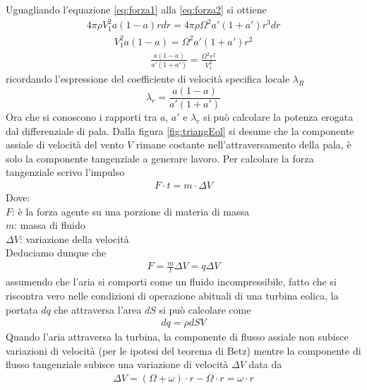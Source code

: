 Uguagliando l'equazione \ref{eq:forza1} alla \ref{eq:forza2} si ottiene
\begin{align*}
4 \pi \rho V_1^2 a \left( 1 - a \right) r dr = 4 \pi \rho \Omega^2 a' \left( 1 + a' \right) r^3 dr
\end{align*}
\begin{align*}
V_1^2 a \left( 1 - a \right) = \Omega^2 a' \left( 1 + a' \right) r^2
\end{align*}
\begin{align*}
\frac{a \left( 1 - a \right)}{a' \left(1 + a' \right)} = \frac{\Omega^2 r^2}{V_1^2}
\end{align*}
ricordando l'espressione del coefficiente di velocità specifica locale $\lambda_R$
\begin{equation}\label{eq:lambdara}
\lambda_r = \frac{a \left(1 - a \right)}{a' \left( 1 + a' \right)}
\end{equation}
Ora che si conoscono i rapporti tra $a$, $a'$ e $\lambda_r$ si può calcolare la potenza erogata dal differenziale di pala. Dalla figura \ref{fig:triangEol} si desume che la componente assiale di velocità del vento $V$ rimane costante nell'attraversamento della pala, è solo la componente tangenziale a generare lavoro. Per calcolare la forza tangenziale scrivo l'impulso 
\begin{align*}
F \cdot t = m \cdot \Delta V
\end{align*}
Dove:\\[1mm]
$F$: è la forza agente su una porzione di materia di massa \\
$m$: massa di fluido\\ 
$\Delta V$: variazione della velocità\\[2mm]
Deduciamo dunque che
\begin{align*}
F = \frac{m}{t} \Delta V = q \Delta V
\end{align*}
assumendo che l'aria si comporti come un fluido incompressibile, fatto che si riscontra vero nelle condizioni di operazione abituali di una turbina eolica, la portata $dq$ che attraversa l'area $dS$ si può calcolare come 
\begin{align*}
dq = \rho dS V
\end{align*}
Quando l'aria attraversa la turbina, la componente di flusso assiale non subisce variazioni di velocità (per le ipotesi del teorema di Betz) mentre la componente di flusso tangenziale subisce una variazione di velocità $\Delta V$ data da
\begin{align*}
\Delta V = \left( \Omega + \omega \right) \cdot r - \Omega \cdot r = \omega \cdot r
\end{align*}
